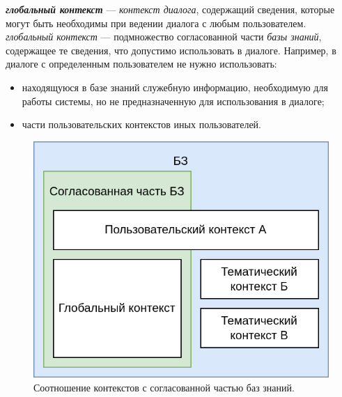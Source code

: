\textbf{\textit{глобальный контекст}} --- \textit{контекст диалога}, содержащий сведения, которые могут быть необходимы при ведении диалога с любым пользователем.
    \textit{глобальный контекст} --- подмножество согласованной части \textit{базы знаний}, содержащее те сведения, что допустимо использовать в диалоге.
Например, в диалоге с определенным пользователем не нужно использовать:
\begin{itemize}
    \item находящуюся в базе знаний служебную информацию, необходимую для работы системы, но не предназначенную для использования в диалоге;
    \item части пользовательских контекстов иных пользователей.
\end{itemize}

\begin{figure}[h]
    \centering
    \includegraphics[scale=0.3]{images/part4/chapter_nl_interfaces/context_in_KB}
    \caption{Соотношение контекстов с согласованной частью баз знаний.}
    \label{fig:context_in_KB}
\end{figure}

\begin{SCn}

    \begin{scnindent}
        \begin{scneqtoset}
        \end{scneqtoset}
    \end{scnindent}

\end{SCn}

